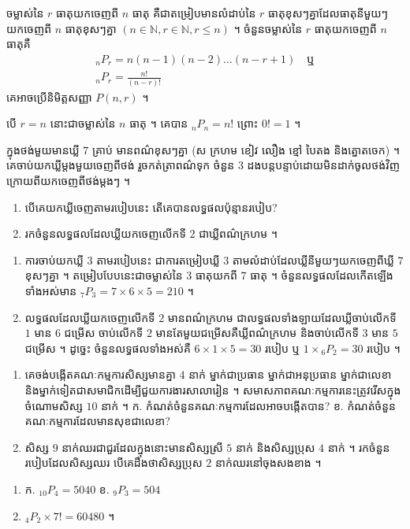 \begin{formulaBox}[ជាទូទៅ]
ចម្លាស់នៃ $r$ ធាតុយកចេញពី $n$ ធាតុ គឺជាតម្រៀបមានលំដាប់នៃ $r$ ធាតុខុសៗគ្នាដែលធាតុនីមួយៗយកចេញពី $n$ ធាតុខុសៗគ្នា $(n \in \mathbb{N}, r \in \mathbb{N}, r \le n)$ ។ ចំនួនចម្លាស់នៃ $r$ ធាតុយកចេញពី $n$ ធាតុគឺ
\[
\begin{gathered}
{}_nP_r = n(n - 1)(n - 2)\dots(n - r + 1) \quad \text{ឬ}\\
{}_nP_r = \frac{n!}{(n - r)!}
\end{gathered}
\]
គេអាចប្រើនិមិត្តសញ្ញា $P(n, r)$ ។
\end{formulaBox}

\begin{note}[សម្គាល់]
បើ $r = n$ នោះជាចម្លាស់នៃ $n$ ធាតុ ។ គេបាន ${}_nP_n = n!$ ព្រោះ $0! = 1$ ។
\end{note}

\begin{example}[លំហាត់គំរូ]
ក្នុងថង់មួយមានឃ្លី $7$ គ្រាប់ មានពណ៌ខុសៗគ្នា (ស ក្រហម ខៀវ លឿង ខ្មៅ បៃតង និងត្នោតចេក) ។ គេចាប់យកឃ្លីម្ដងមួយចេញពីថង់ រួចកត់ត្រាពណ៌ទុក ចំនួន $3$ ដងបន្តបន្ទាប់ដោយមិនដាក់ចូលថង់វិញ ក្រោយពីយកចេញពីថង់ម្ដងៗ ។
\begin{enumerate}[a]
  \item បើគេយកឃ្លីចេញតាមរបៀបនេះ តើគេបានលទ្ធផលប៉ុន្មានរបៀប?
  \item រកចំនួនលទ្ធផលដែលឃ្លីយកចេញលើកទី $2$ ជាឃ្លីពណ៌ក្រហម ។
\end{enumerate}
\end{example}
\ans
\begin{enumerate}[a]
  \item ការចាប់យកឃ្លី $3$ តាមរបៀបនេះ ជាការតម្រៀបឃ្លី $3$ តាមលំដាប់ដែលឃ្លីនីមួយៗយកចេញពីឃ្លី $7$ ខុសៗគ្នា ។ តម្រៀបបែបនេះជាចម្លាស់នៃ $3$ ធាតុយកពី $7$ ធាតុ ។ ចំនួនលទ្ធផលដែលកើតឡើងទាំងអស់មាន ${}_7P_3 = 7\times 6\times 5 = 210$ ។
  \item លទ្ធផលដែលឃ្លីយកចេញលើកទី $2$ មានពណ៌ក្រហម ជាលទ្ធផលទាំងឡាយដែលឃ្លីចាប់លើកទី $1$ មាន $6$ ជម្រើស ចាប់លើកទី $2$ មានតែមួយជម្រើសគឺឃ្លីពណ៌ក្រហម និងចាប់លើកទី $3$ មាន $5$ ជម្រើស ។ ដូច្នេះ ចំនួនលទ្ធផលទាំងអស់គឺ $6\times 1\times 5 = 30$ របៀប ឬ $1\times{}_6P_2 = 30$ របៀប ។
\end{enumerate}

\begin{pro}
\begin{enumerate}[1]
  \item គេចង់បង្កើតគណៈកម្មការសិស្សមានគ្នា $4$ នាក់ ម្នាក់ជាប្រធាន ម្នាក់ជាអនុប្រធាន ម្នាក់ជាលេខា និងម្នាក់ទៀតជាសមាជិកដើម្បីជួយការងារសាលារៀន ។ សមាសភាពគណៈកម្មការនេះត្រូវរើសក្នុងចំណោមសិស្ស $10$ នាក់ ។ ក. កំណត់ចំនួនគណៈកម្មការដែលអាចបង្កើតបាន? \quad ខ. កំណត់ចំនួនគណៈកម្មការដែលមានសុខជាលេខា?
  \item សិស្ស $9$ នាក់ឈរជាជួរដែលក្នុងនោះមានសិស្សស្រី $5$ នាក់ និងសិស្សប្រុស $4$ នាក់ ។ រកចំនួនរបៀបដែលសិស្សឈរ បើគេដឹងថាសិស្សប្រុស $2$ នាក់ឈរនៅចុងសងខាង ។
\end{enumerate}
\ans
\begin{enumerate}[1]
  \item ក. ${}_{10}P_4 = 5040$ \quad ខ. ${}_9P_3 = 504$
  \item ${}_4P_2\times 7! = 60480$ ។
\end{enumerate}
\end{pro}

